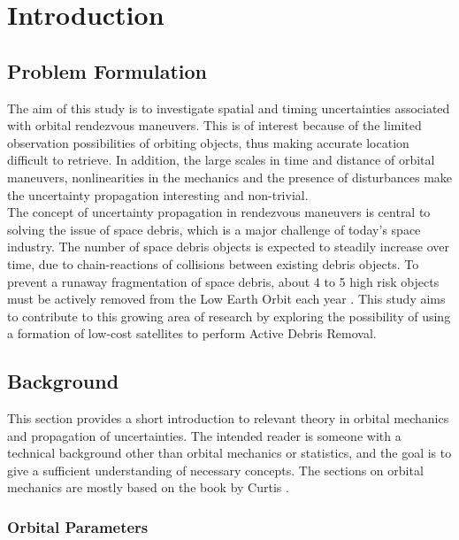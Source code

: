 \section{Introduction}

\subsection{Problem Formulation}

The aim of this study is to investigate spatial and timing uncertainties associated with orbital rendezvous maneuvers. This is of interest because of the limited observation possibilities of orbiting objects, thus making accurate location difficult to retrieve. In addition, the large scales in time and distance of orbital maneuvers, nonlinearities in the mechanics and the presence of disturbances make the uncertainty propagation interesting and non-trivial. \\

The concept of uncertainty propagation in rendezvous maneuvers is central to solving the issue of space debris, which is a major challenge of today's space industry. The number of space debris objects is expected to steadily increase over time, due to chain-reactions of collisions between existing debris objects. To prevent a runaway fragmentation of space debris, about 4 to 5 high risk objects must be actively removed from the Low Earth Orbit each year \cite{ESA_about_space_debris}. This study aims to contribute to this growing area of research by exploring the possibility of using a formation of low-cost satellites to perform Active Debris Removal. \\








\subsection{Background}

This section provides a short introduction to relevant theory in orbital mechanics and propagation of uncertainties. The intended reader is someone with a technical background other than orbital mechanics or statistics, and the goal is to give a sufficient understanding of necessary concepts. The sections on orbital mechanics are mostly based on the book by Curtis \cite{Curtis2009}.


\subsubsection{Orbital Parameters}


